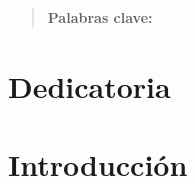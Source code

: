 \documentclass[12pt]{report} %
\begin{document}
\newpage %
\thispagestyle{empty}
\mbox{}

\renewcommand\abstractname{\large\bfseries\filcenter\uppercase{Resumen}}
\begin{abstract}
\thispagestyle{plain}
\setcounter{page}{3}
	
	
	\textbf{Palabras clave:}
	
	\vfill
\end{abstract}
	\newpage %
	\thispagestyle{empty}
	\mbox{}


\chapter*{Dedicatoria}

\setcounter{page}{5}
	
		
	\vfill
	
	\newpage %
	\thispagestyle{empty}
	\mbox{}
	


\tableofcontents
\thispagestyle{fancy}

\newpage %
\thispagestyle{empty}
\mbox{}

\listoffigures
\thispagestyle{fancy}

\newpage %
\thispagestyle{empty}
\mbox{}

\listoftables
\thispagestyle{fancy}

\newpage %
\thispagestyle{empty}
\mbox{}


\clearpage
{} %

\chapter{Introducción}

	
\end{document}
